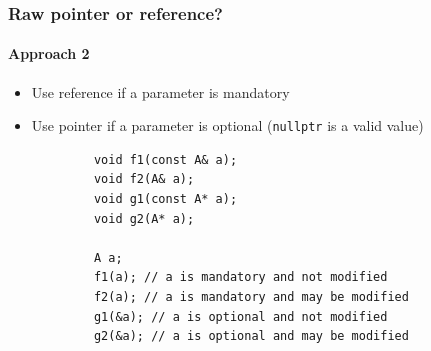 \documentclass{beamer}
\begin{document}
\begin{frame}[fragile]
\frametitle{Raw pointer or reference?}
\framesubtitle{Approach 2}
    \begin{itemize}
    \item Use reference if a parameter is mandatory
    \item Use pointer if a parameter is optional (\texttt{nullptr} is a valid value)
    \end{itemize}
    \begin{example}
        \begin{lstlisting}
            void f1(const A& a);
            void f2(A& a);
            void g1(const A* a);
            void g2(A* a);

            A a;
            f1(a); // a is mandatory and not modified
            f2(a); // a is mandatory and may be modified
            g1(&a); // a is optional and not modified
            g2(&a); // a is optional and may be modified
        \end{lstlisting}
    \end{example}
\end{frame}
\end{document}
